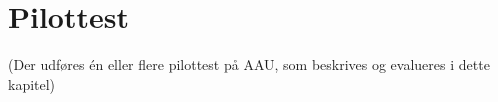 \chapter{Pilottest}
\label{TestAfSkalaPilottest}
%
(Der udføres én eller flere pilottest på AAU, som beskrives og evalueres i dette kapitel)